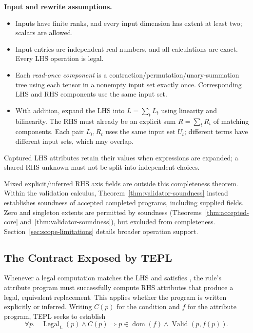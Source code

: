 \noindent\textbf{Input and rewrite assumptions.}
\begin{itemize}
\item Inputs have finite ranks, and every input dimension has extent at least
two; scalars are allowed.
\item Input entries are independent real numbers, and all calculations are
exact. Every LHS operation is legal.
\item Each \emph{read-once component} is a contraction/permutation/unary-summation
tree using each tensor in a nonempty input set exactly once. Corresponding
LHS and RHS components use the same input set.
\item With addition, expand the LHS into $L=\sum_t L_t$ using linearity and
bilinearity. The RHS must already be an explicit sum $R=\sum_t R_t$ of
matching components. Each pair $L_t,R_t$ uses the same input set $U_t$;
different terms have different input sets, which may overlap.
\end{itemize}
Captured LHS attributes retain their values when expressions are expanded;
a shared RHS unknown must not be split into independent choices.

Mixed explicit/inferred RHS axis fields are outside this completeness
theorem. Within the validation calculus, Theorem~\ref{thm:validator-soundness}
instead establishes soundness of accepted completed programs, including
supplied fields. Zero and singleton extents are permitted by soundness
(Theorems~\ref{thm:accepted-core} and~\ref{thm:validator-soundness}), but excluded
from completeness. Section~\ref{sec:scope-limitations} details broader operation support.

\subsection{The Contract Exposed by TEPL}
\label{sec:contract}
Whenever a legal computation matches the LHS and satisfies ,
the rule's attribute program must successfully compute RHS attributes that
produce a legal, equivalent replacement. This applies whether the program
is written explicitly or inferred. Writing $C(p)$ for the condition and $f$
for the attribute program, TEPL seeks to establish
\begin{equation}
 \forall p.\quad \operatorname{Legal}_L(p)\land C(p)
 \Longrightarrow p\in\operatorname{dom}(f)
 \land\operatorname{Valid}(p,f(p)).
\label{eq:contract}
\end{equation}
